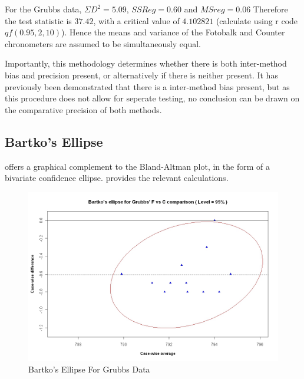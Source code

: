 \documentclass[12pt, a4paper]{article}
\begin{document}
For the Grubbs data, $\Sigma D^{2}=5.09 $, $SSReg = 0.60$ and
$MSreg=0.06$ Therefore the test statistic is $37.42$, with a
critical value of $4.102821$ (calculate using r code
$qf(0.95,2,10)$). Hence the means and variance of the Fotobalk and
Counter chronometers are assumed to be simultaneously equal.

Importantly, this methodology determines whether there is both
inter-method bias and precision present, or alternatively if there
is neither present. It has previously been demonstrated that there
is a inter-method bias present, but as this procedure does not
allow for seperate testing, no conclusion can be drawn on the
comparative precision of both methods.
\newpage
\subsection{Bartko's Ellipse}
\citet{Bartko} offers a graphical complement to the Bland-Altman
plot, in the form of a bivariate confidence ellipse.
\citet{AltmanEllipse} provides the relevant calculations.

\begin{figure}[h!]
  \includegraphics[width=130mm]{GrubbsBartko.jpeg}
  \caption{Bartko's Ellipse For Grubbs Data}\label{GrubbsBartko}
\end{figure}



\end{document}
